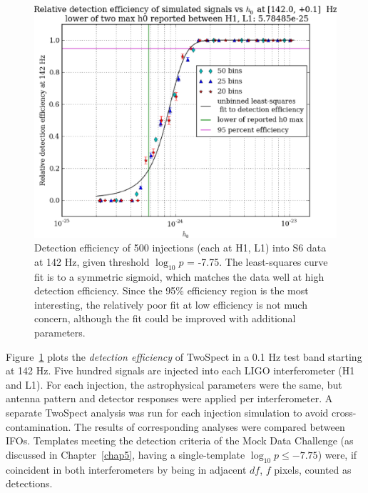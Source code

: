 \begin{figure}
\begin{center}
\includegraphics[width=0.70\paperwidth,height=0.48\paperheight]{plots/detectionEfficiencyh0-142-0Hz.eps}
\caption{Detection efficiency of 500 injections (each at H1, L1) into
S6 data at 142 Hz, given threshold $\log_{10}p$ = -7.75.
The least-squares curve fit is to a symmetric sigmoid, which matches the data well at high detection efficiency.
Since the 95\% efficiency region is the most interesting, the relatively poor fit at low efficiency is not much concern, although the fit could be improved with additional parameters.}
\label{S6_det_eff_142}
\end{center}
\end{figure}

Figure~\ref{S6_det_eff_142} plots the \textit{detection efficiency} of TwoSpect in a 0.1 Hz test band starting at 142 Hz.
Five hundred signals are injected into each LIGO interferometer (H1 and L1).
For each injection, the astrophysical parameters were the same, but antenna pattern and detector responses were applied per interferometer.
A separate TwoSpect analysis was run for each injection simulation to avoid cross-contamination.
The results of corresponding analyses were compared between IFOs.
Templates meeting the detection criteria of the Mock Data Challenge (as discussed in Chapter~\ref{chap5}, having a single-template $\log_{10} p \leq -7.75$) were, if coincident in both interferometers by being in adjacent $df$, $f$ pixels, counted as detections.


